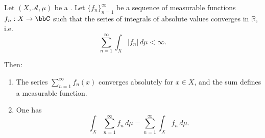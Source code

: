 \begin{proposition} \label{proposition:absolute_convergence_justifies_interchange_of_summation_and_integration}
    Let $(X,\mathcal{A},\mu)$ be a .
    Let $\{f_n\}_{n=1}^\infty$ be a sequence of measurable functions $f_n : X \to \bbC$ such that the series of integrals of absolute values converges in $\mathbb{R}$, i.e.
    $$\sum_{n=1}^\infty \int_X |f_n|\,d\mu < \infty.$$

    Then:

    \begin{enumerate}
        \item The series $\sum_{n=1}^\infty f_n(x)$ converges absolutely for  $x \in X$, and the sum defines a measurable function.

        \item One has
        $$\int_X \sum_{n=1}^\infty f_n\,d\mu = \sum_{n=1}^\infty \int_X f_n\,d\mu.$$
    \end{enumerate}
\end{proposition}
